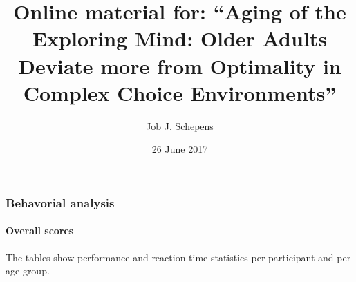 \documentclass[,]{article}
\title{Online material for: ``Aging of the Exploring Mind: Older Adults Deviate
more from Optimality in Complex Choice Environments''}
\author{Job J. Schepens}
\date{26 June 2017}
\let\oldparagraph\paragraph
\renewcommand{\paragraph}[1]{\oldparagraph{#1}\mbox{}}
\begin{document}
\maketitle

{
\setcounter{tocdepth}{6}
\tableofcontents
}
\newpage

\subsubsection{Behavorial analysis}\label{behavorial-analysis}

\paragraph{Overall scores}\label{overall-scores}

The tables show performance and reaction time statistics per participant
and per age group.

\newpage 
\end{document}
